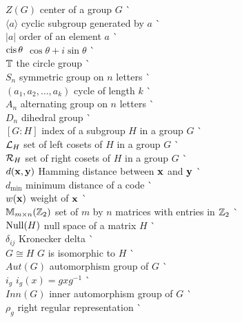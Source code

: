 \begin{tabbing}
$Z(G)$ \> center of a group $G$ \> \` \pageref{centerofagroup} \\
$\langle a \rangle$ \> cyclic subgroup generated by $a$ \>
     \` \pageref{generatedby} \\  
$|a|$ \> order of an element $a$ \> \`
     \pageref{noteelementorder} \\
$\operatorname{cis} \theta$ \> $\cos \theta + i \sin \theta$ \> 
     \` \pageref{cosisin} \\
${\Bbb T}$ \> the circle group \> \` \pageref{notecirclegroup} \\
$S_n$ \> symmetric group on $n$ letters \> 
     \` \pageref{symmetricgroup} \\
$(a_1, a_2, \ldots, a_k )$ \> cycle of length $k$ \> 
     \` \pageref{notecycle} \\
$A_n$ \> alternating group on $n$ letters \> 
     \` \pageref{alternatinggroup} \\
$D_n$ \> dihedral group \> \` \pageref{dihedralgroup} \\
$[G:H]$ \> index of a subgroup $H$ in a group $G$ \> 
     \` \pageref{indexofasubgroup}  \\
${\cal L}_H$ \> set of left cosets of $H$ in a group $G$ \> 
     \` \pageref{notesetleft} \\
${\cal R}_H$ \> set of right cosets of $H$ in a group $G$ \>
     \` \pageref{notesetright}  \\
$d({\bold x}, {\bold y})$ \> Hamming distance between ${\bold x}$ and
     ${\bold y}$ \> \` \pageref{noteHammingdist} \\
$d_{\min}$ \> minimum distance of a code \> \` \pageref{notemindist}\\ 
$w({\bold x})$ \> weight of ${\bold x}$ \> \` \pageref{noteweight} \\
${\Bbb M}_{m \times n}({\Bbb Z}_2)$ \> set of $m$ by $n$ matrices with 
     entries in ${\Bbb Z}_2$ \> \` \pageref{notembyn} \\
${\rm Null}(H)$ \> null space of a matrix $H$ \> 
     \` \pageref{notenull} \\
$\delta_{ij}$ \> Kronecker delta \> \` \pageref{notekron} \\
$G \cong H$ \> $G$ is isomorphic to $H$ \> \` \pageref{noteisomorph} \\
$Aut(G)$ \> automorphism group of $G$ \> \` \pageref{noteauto} \\
$i_g$ \> $i_g(x) = gxg^{-1}$ \> \` \pageref{noteinner} \\
$Inn(G)$ \> inner automorphism group of $G$ \> \` \pageref{noteinneraut} \\
$\rho_g$ \> right regular representation \> \` \pageref{noterightreg}
\end{tabbing} \clearpage
